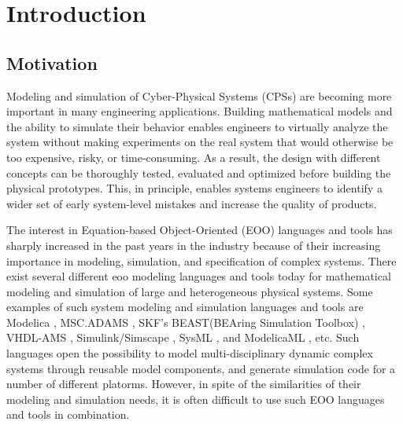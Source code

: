 

\chapter{Introduction}
\label{cha:introduction}


\section{Motivation}
\label{sec:motivation}

Modeling and simulation of Cyber-Physical Systems (CPSs) are becoming more important in many engineering applications. Building mathematical models and the ability to simulate their behavior enables engineers to virtually analyze the system without making experiments on the real system that would otherwise be too expensive, risky, or time-consuming. As a result, the design with different concepts can be thoroughly tested, evaluated and optimized before building the physical prototypes. This, in principle, enables systems engineers to identify a wider set of early system-level mistakes and increase the quality of products.

The interest in Equation-based Object-Oriented (EOO) languages and tools has sharply increased in the past years in the industry because of their increasing importance in modeling, simulation, and specification of complex systems. There exist several different \acrshort{eoo} modeling languages and tools today for mathematical modeling and simulation of large and heterogeneous physical systems. Some examples of such system modeling and simulation languages and tools are Modelica \cite{modelica}, MSC.ADAMS \cite{adams}, SKF’s BEAST(BEAring Simulation Toolbox) \cite{beast}, VHDL-AMS \cite{vhdlamsernst, vhdlamsieee}, Simulink/Simscape \cite{simulink}, SysML \cite{sysml,sysmlmorgan}, and ModelicaML \cite{modelicamlreport, modelicaml}, etc. Such languages open the possibility to model multi-disciplinary dynamic complex systems through reusable model components, and generate simulation code  for a number of different platorms. However, in spite of the similarities of their modeling and simulation needs, it is often difficult to use such EOO languages and tools in combination.

